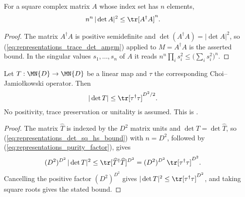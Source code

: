 \begin{lemma}
    \label{lem:det_sq_le_hilbert_schmidt_pow}
    \leanok
    For a square complex matrix $A$ whose index set has $n$ elements,
    \begin{align}
        n^{n}\,|\det A|^2 &\leq \tr[A^\dagger A]^{n}.
        \label{eq:representations_det_sq_hs_bound}
    \end{align}
\end{lemma}

\begin{proof}\leanok
    The matrix $A^\dagger A$ is positive semidefinite and
    $\det(A^\dagger A)=|\det A|^2$, so
    (\ref{eq:representations_trace_det_amgm}) applied to $M=A^\dagger A$ is the
    asserted bound. In the singular values $s_1,\dots,s_n$ of $A$ it reads
    $n^n\prod_i s_i^2\leq\bigl(\sum_i s_i^2\bigr)^n$.
\end{proof}

\begin{theorem}
    \label{thm:channelDet_le_choi_purity}
    \leanok
    Let $T:\MN{D}\to\MN{D}$ be a linear map and $\tau$ the corresponding
    Choi--Jamio\l{}kowski operator. Then
    \begin{align}
        |\det T| &\le \tr[\tau^\dagger\tau]^{D^2/2}.
        \label{eq:representations_det_choi_bound}
    \end{align}
    No positivity, trace preservation or unitality is assumed. This is
    \cite[Eq.~(6.27)]{Wolf2012Quantum}.
\end{theorem}

\begin{proof}\leanok
    The matrix $\widehat{T}$ is indexed by the $D^2$ matrix units and
    $\det T=\det\widehat{T}$, so (\ref{eq:representations_det_sq_hs_bound}) with
    $n=D^2$, followed by (\ref{eq:representations_purity_factor}), gives
    \begin{align}
        (D^2)^{D^2}\,|\det T|^2
        &\le \tr[\widehat{T}^\dagger\widehat{T}]^{D^2}
        = (D^2)^{D^2}\,\tr[\tau^\dagger\tau]^{D^2}.
        \notag
    \end{align}
    Cancelling the positive factor $(D^2)^{D^2}$ gives
    $|\det T|^2\le\tr[\tau^\dagger\tau]^{D^2}$, and taking square roots gives
    the stated bound.
\end{proof}

